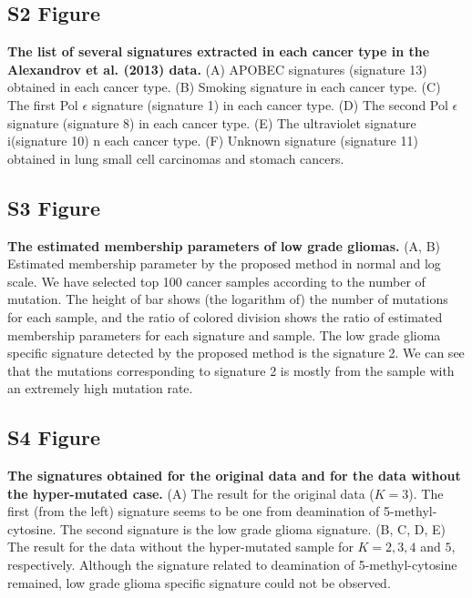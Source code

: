 \documentclass[10pt,letterpaper]{article}
\begin{document}
\subsection*{S2 Figure}
\label{nature2013_sig_list}
{\bf The list of several signatures extracted in each cancer type in the Alexandrov et al. (2013) data.}
(A) APOBEC signatures (signature 13) obtained in each cancer type.
(B) Smoking signature in each cancer type.
(C) The first Pol $\epsilon$ signature (signature 1)  in each cancer type.
(D) The second Pol $\epsilon$ signature (signature 8) in each cancer type.
(E) The ultraviolet signature i(signature 10) n each cancer type.
(F) Unknown signature (signature 11) obtained in lung small cell carcinomas and stomach cancers.


\subsection*{S3 Figure}
\label{LGG_membership}
{\bf The estimated membership parameters of low grade gliomas.}
(A, B) Estimated membership parameter by the proposed method in normal and log scale.
We have selected top 100 cancer samples according to the number of mutation.
The height of bar shows (the logarithm of) the number of mutations for each sample,
and the ratio of colored division shows the ratio of estimated membership parameters for each signature and sample.
The low grade glioma specific signature detected by the proposed method is the signature 2.
We can see that the mutations corresponding to signature 2 is mostly from the sample with an extremely high mutation rate.


\subsection*{S4 Figure}
\label{LGG_signatures}
{\bf The signatures obtained for the original data and for the data without the hyper-mutated case.}
(A) The result for the original data ($K = 3$). The first (from the left) signature seems to be one from deamination of 5-methyl-cytosine. 
The second signature is the low grade glioma signature.
(B, C, D, E) The result for the data without the hyper-mutated sample for $K = 2, 3, 4$ and $5$, respectively.
Although the signature related to deamination of 5-methyl-cytosine remained, low grade glioma specific signature could not be observed.
\end{document}
